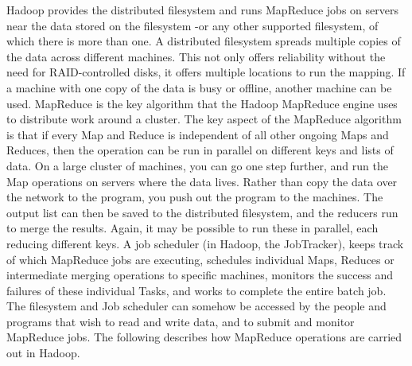 \documentclass[a4paper,12pt,oneside]{report}
\begin{document}
Hadoop provides the distributed filesystem and runs MapReduce jobs on servers near the data stored on the filesystem -or any other supported filesystem, of which there is more than one.
A distributed filesystem spreads multiple copies of the data across different machines. This not only offers reliability without the need for RAID-controlled disks, it offers multiple locations to run the mapping. If a machine with one copy of the data is busy or offline, another machine can be used. 
MapReduce is the key algorithm that the Hadoop MapReduce engine uses to distribute work around a cluster. 
The key aspect of the MapReduce algorithm is that if every Map and Reduce is independent of all other ongoing Maps and Reduces, then the operation can be run in parallel on different keys and lists of data. On a large cluster of machines, you can go one step further, and run the Map operations on servers where the data lives. Rather than copy the data over the network to the program, you push out the program to the machines. The output list can then be saved to the distributed filesystem, and the reducers run to merge the results. Again, it may be possible to run these in parallel, each reducing different keys. 
A job scheduler (in Hadoop, the JobTracker), keeps track of which MapReduce jobs are executing, schedules individual Maps, Reduces or intermediate merging operations to specific machines, monitors the success and failures of these individual Tasks, and works to complete the entire batch job. 
The filesystem and Job scheduler can somehow be accessed by the people and programs that wish to read and write data, and to submit and monitor MapReduce jobs. 
The following describes how MapReduce operations are carried out in Hadoop. 
\end{document}
